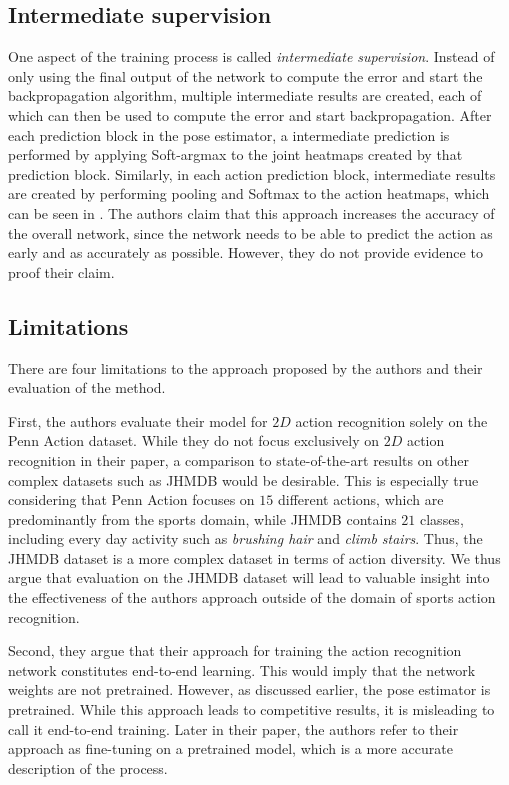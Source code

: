 \subsection{Intermediate supervision}
\label{sec:luvizon_intermediate_supervision}
One aspect of the training process is called \textit{intermediate supervision}.
Instead of only using the final output of the network to compute the error and start the backpropagation algorithm, multiple intermediate results are created, each of which can then be used to compute the error and start backpropagation.
After each prediction block in the pose estimator, a intermediate prediction is performed by applying Soft-argmax to the joint heatmaps created by that prediction block.
Similarly, in each action prediction block, intermediate results are created by performing pooling and Softmax to the action heatmaps, which can be seen in .
The authors claim that this approach increases the accuracy of the overall network, since the network needs to be able to predict the action as early and as accurately as possible.
However, they do not provide evidence to proof their claim.  

\subsection{Limitations}
\label{sec:deephar_limitations}
There are four limitations to the approach proposed by the authors and their evaluation of the method.

First, the authors evaluate their model for $2D$ action recognition solely on the Penn Action dataset.
While they do not focus exclusively on $2D$ action recognition in their paper, a comparison to state-of-the-art results on other complex datasets such as JHMDB would be desirable.
This is especially true considering that Penn Action focuses on $15$ different actions, which are predominantly from the sports domain, while JHMDB contains $21$ classes, including every day activity such as \textit{brushing hair} and \textit{climb stairs}.
Thus, the JHMDB dataset is a more complex dataset in terms of action diversity.
We thus argue that evaluation on the JHMDB dataset will lead to valuable insight into the effectiveness of the authors approach outside of the domain of sports action recognition. 

Second, they argue that their approach for training the action recognition network constitutes end-to-end learning.
This would imply that the network weights are not pretrained.
However, as discussed earlier, the pose estimator is pretrained.
While this approach leads to competitive results, it is misleading to call it end-to-end training.
Later in their paper, the authors refer to their approach as fine-tuning on a pretrained model, which is a more accurate description of the process. 

